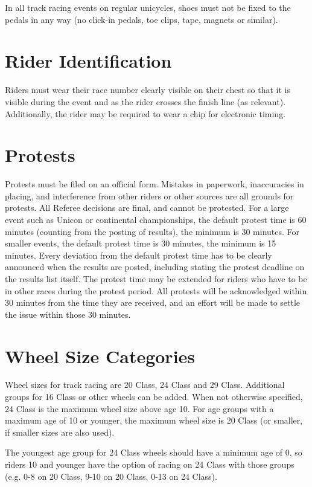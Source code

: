 In all track racing events on regular unicycles, shoes must not be fixed to the pedals in any way (no click-in pedals, toe clips, tape, magnets or similar).

\section{Rider Identification}

Riders must wear their race number clearly visible on their chest so that it is visible during the event and as the rider crosses the finish line (as relevant).
Additionally, the rider may be required to wear a chip for electronic timing.

\section{Protests}

Protests must be filed on an official form.
Mistakes in paperwork, inaccuracies in placing, and interference from other riders or other sources are all grounds for protests.
All Referee decisions are final, and cannot be protested.
For a large event such as Unicon or continental championships, the default protest time is 60 minutes (counting from the posting of results), the minimum is 30 minutes.
For smaller events, the default protest time is 30 minutes, the minimum is 15 minutes.
Every deviation from the default protest time has to be clearly announced when the results are posted, including stating the protest deadline on the results list itself.
The protest time may be extended for riders who have to be in other races during the protest period.
All protests will be acknowledged within 30 minutes from the time they are received, and an effort will be made to settle the issue within those 30 minutes.

\section{Wheel Size Categories}

Wheel sizes for track racing are 20 Class, 24 Class and 29 Class.
Additional groups for 16 Class or other wheels can be added.
When not otherwise specified, 24 Class is the maximum wheel size above age 10.
For age groups with a maximum age of 10 or younger, the maximum wheel size is 20 Class (or smaller, if smaller sizes are also used).

The youngest age group for 24 Class wheels should have a minimum age of 0, so riders 10 and younger have the option of racing on 24 Class with those groups (e.g. 0-8 on 20 Class, 9-10 on 20 Class, 0-13 on 24 Class).

